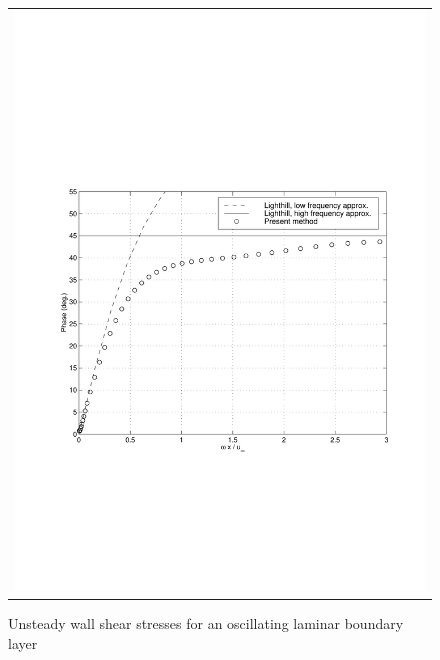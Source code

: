 \begin{figure}
\begin{center}
\begin{tabular}{c}
{        \includegraphics[width=110mm,clip=t]{CHAP_LINEAR/FIGURE/flat_laminar_phase.pdf}}
   \end{tabular}
 \end{center}
 \vspace{-7mm}
 \caption{Unsteady wall shear stresses for an oscillating laminar boundary layer}
 \label{flat_laminar_linear_sol.fig}
\end{figure}
%
